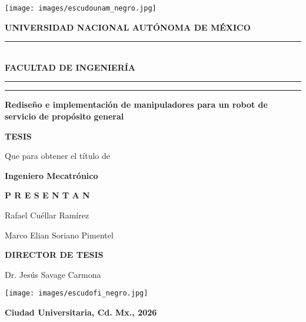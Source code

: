 \documentclass[12pt,twoside]{report}
\begin{document}
\thispagestyle{empty}

\begin{minipage}[t]{20cm}
  \texttt{[image: images/escudounam\_negro.jpg]}
  \hspace{0.5cm}
  \begin{minipage}[b]{14cm}
    \centering
    {\large \textbf{UNIVERSIDAD NACIONAL AUTÓNOMA DE MÉXICO}}\\[6pt]
    \rule{0.9\linewidth}{2pt}\\[6pt]
    {\large\textbf{FACULTAD DE INGENIERÍA}}
  \end{minipage}
\end{minipage}

\begin{minipage}[t]{20cm}
  \vspace{1mm}
  \hspace{0.5cm} %
  \rule{3pt}{450pt}\hspace{15pt}\rule{3pt}{450pt}
  \hspace{1cm} %
  \begin{minipage}[b]{15cm}
    \centering
    \Large\textbf{Rediseño e implementación de manipuladores para un robot de servicio de propósito general}
    \vspace{3cm}

    \Large\textbf{TESIS}
    
    \large Que para obtener el título de
    
    \Large\textbf{Ingeniero Mecatrónico}
    \vspace{2cm}
    
    \Large\textbf{P R E S E N T A N}
    
    \Large Rafael Cuéllar Ramírez
    
    \Large Marco Elian Soriano Pimentel
    \vspace{2cm}
    
    \Large\textbf{DIRECTOR DE TESIS}
    
    \Large Dr. Jesús Savage Carmona
  \end{minipage}
\end{minipage}

\vspace{2cm}

\begin{minipage}[t]{4cm}
  \texttt{[image: images/escudofi\_negro.jpg]}
\end{minipage}
\hspace{5cm}
\begin{minipage}[t]{9cm}
  \raggedleft
  \textbf{Ciudad Universitaria, Cd. Mx., 2026}
\end{minipage}
\end{document}
